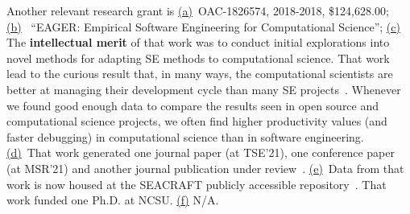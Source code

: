 
Another relevant research grant is 
\underline{(a)}~OAC-1826574, 2018-2018, 
\$124,628.00;
\underline{(b)}~
``EAGER: Empirical Software Engineering for Computational Science'';
\underline{(c)}~ 
The {\bf intellectual merit} of that work was to
conduct initial explorations into novel methods for adapting SE methods to computational science.
That work lead to the curious
result that, in many ways,
the computational scientists are better
at managing their development cycle
than many SE projects~\cite{tu2020changing}. Whenever
we found good enough data to compare the results
seen in open source and computational
science projects, we often find higher productivity
values (and faster debugging) in computational science
than in software engineering. 
\underline{(d)}~That work generated 
one journal paper (at TSE'21),
one conference paper (at MSR'21) and another journal publication under review~\cite{Ling21}.
 \underline{(e)}~Data from that work is now housed at the SEACRAFT publicly accessible repository~\cite{menzies2017seacraft}. That work  funded one Ph.D. at NCSU. 
 \underline{(f)} N/A.  
 
 
 \newpage

 

  